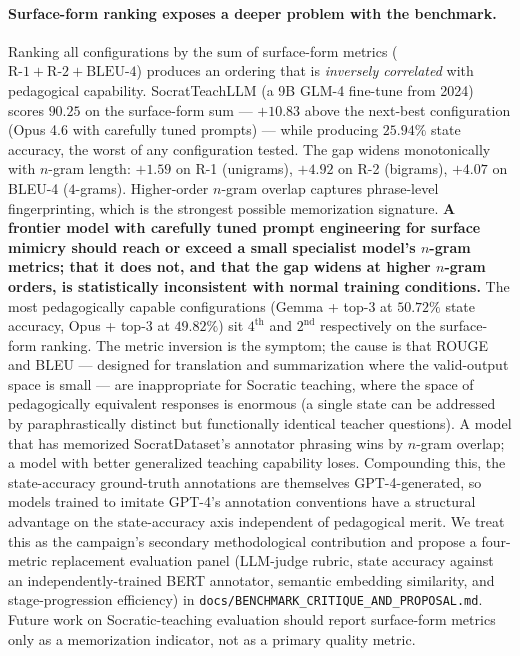 \documentclass[11pt]{article}
\begin{document}
\paragraph{Surface-form ranking exposes a deeper problem with the benchmark.} Ranking all configurations by the sum of surface-form metrics ($\text{R-1}+\text{R-2}+\text{BLEU-4}$) produces an ordering that is \emph{inversely correlated} with pedagogical capability. SocratTeachLLM (a 9B GLM-4 fine-tune from 2024) scores $90.25$ on the surface-form sum --- $+10.83$ above the next-best configuration (Opus 4.6 with carefully tuned prompts) --- while producing $25.94\%$ state accuracy, the worst of any configuration tested. The gap widens monotonically with $n$-gram length: $+1.59$ on R-1 (unigrams), $+4.92$ on R-2 (bigrams), $+4.07$ on BLEU-4 ($4$-grams). Higher-order $n$-gram overlap captures phrase-level fingerprinting, which is the strongest possible memorization signature. \textbf{A frontier model with carefully tuned prompt engineering for surface mimicry should reach or exceed a small specialist model's $n$-gram metrics; that it does not, and that the gap widens at higher $n$-gram orders, is statistically inconsistent with normal training conditions.} The most pedagogically capable configurations (Gemma + top-3 at $50.72\%$ state accuracy, Opus + top-3 at $49.82\%$) sit $4^\text{th}$ and $2^\text{nd}$ respectively on the surface-form ranking. The metric inversion is the symptom; the cause is that ROUGE and BLEU --- designed for translation and summarization where the valid-output space is small --- are inappropriate for Socratic teaching, where the space of pedagogically equivalent responses is enormous (a single state can be addressed by paraphrastically distinct but functionally identical teacher questions). A model that has memorized SocratDataset's annotator phrasing wins by $n$-gram overlap; a model with better generalized teaching capability loses. Compounding this, the state-accuracy ground-truth annotations are themselves GPT-4-generated, so models trained to imitate GPT-4's annotation conventions have a structural advantage on the state-accuracy axis independent of pedagogical merit. We treat this as the campaign's secondary methodological contribution and propose a four-metric replacement evaluation panel (LLM-judge rubric, state accuracy against an independently-trained BERT annotator, semantic embedding similarity, and stage-progression efficiency) in \texttt{docs/BENCHMARK\_CRITIQUE\_AND\_PROPOSAL.md}. Future work on Socratic-teaching evaluation should report surface-form metrics only as a memorization indicator, not as a primary quality metric.
\end{document}
